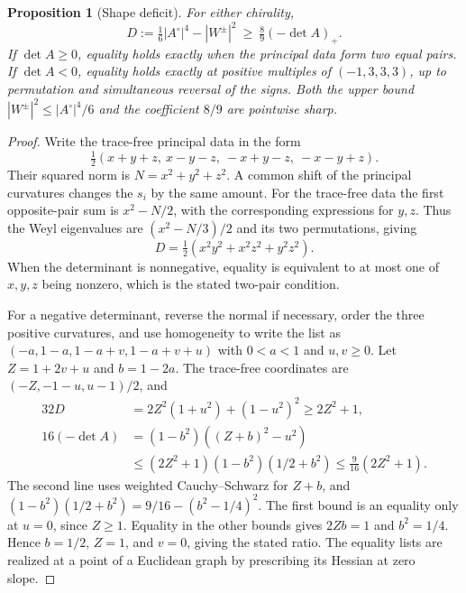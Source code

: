 \documentclass[11pt,letterpaper]{article}
\numberwithin{equation}{section}
\newtheorem{proposition}[theorem]{Proposition}
\begin{document}
\begin{proposition}[Shape deficit]\label{prop:deficit}
For either chirality,
\begin{equation}\label{eq:shape-deficit}
 D:=\tfrac16 |A^\circ|^4-|W^\pm|^2
 \ \ge\ \tfrac89(-\det A)_+ .
\end{equation}
If \(\det A\ge0\), equality holds exactly when the principal data
form two equal pairs. If \(\det A<0\), equality holds exactly at
positive multiples of \((-1,3,3,3)\), up to permutation and
simultaneous reversal of the signs. Both the upper bound
\(|W^\pm|^2\le |A^\circ|^4/6\) and the coefficient \(8/9\)
are pointwise sharp.
\end{proposition}
\begin{proof}
Write the trace-free principal data in the form
\[
 \tfrac12(x+y+z,\ x-y-z,\ -x+y-z,\ -x-y+z).
\]
Their squared norm is \(N=x^2+y^2+z^2\). A common shift of the
principal curvatures changes the \(s_i\) by the same amount.
For the trace-free data the first opposite-pair sum is
\(x^2-N/2\), with the corresponding expressions for \(y,z\).
Thus the Weyl eigenvalues are \((x^2-N/3)/2\) and its two
permutations, giving
\[
 D=\tfrac12(x^2y^2+x^2z^2+y^2z^2).
\]
When the determinant is nonnegative, equality is equivalent
to at most one of \(x,y,z\) being nonzero, which is the stated
two-pair condition.

For a negative determinant, reverse the normal if necessary,
order the three positive curvatures, and use homogeneity to write
the list as \((-a,1-a,1-a+v,1-a+v+u)\) with \(0<a<1\) and
\(u,v\ge0\). Let \(Z=1+2v+u\) and \(b=1-2a\).
The trace-free coordinates are \((-Z,-1-u,u-1)/2\), and
\[
 \begin{split}
 32D&=2Z^2(1+u^2)+(1-u^2)^2\ge 2Z^2+1,\\
 16(-\det A)&=(1-b^2)((Z+b)^2-u^2)\\
 &\le (2Z^2+1)(1-b^2)(1/2+b^2)
       \le \tfrac9{16}(2Z^2+1).
 \end{split}
\]
The second line uses weighted Cauchy--Schwarz for \(Z+b\),
and \((1-b^2)(1/2+b^2)=9/16-(b^2-1/4)^2\).
The first bound is an equality only at \(u=0\), since \(Z\ge1\).
Equality in the other bounds gives \(2Zb=1\) and \(b^2=1/4\).
Hence \(b=1/2\), \(Z=1\), and \(v=0\), giving the stated ratio.
The equality lists are realized at a point of a Euclidean graph
by prescribing its Hessian at zero slope.
\end{proof}
\end{document}
